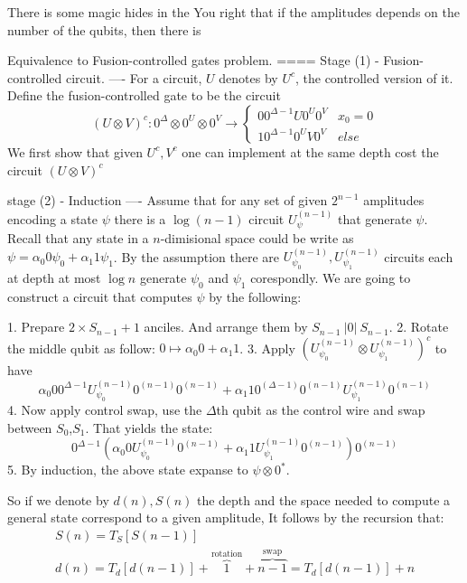 There is some magic hides in the You right that if the amplitudes depends on the number of the qubits, then there is  

Equivalence to Fusion-controlled gates problem.
====
Stage (1) - Fusion-controlled circuit.
----
For a circuit, $U$ denotes by $U^{c}$, the controlled version of it. Define the fusion-controlled gate to be the circuit $$(U\otimes V)^{c} :0^{\Delta}\otimes 0^{U}\otimes 0^{V}   \rightarrow \begin{cases} 0 0^{\Delta -1} U0^{U} 0^{V} & x_{0} = 0\\ 1 0^{\Delta -1} 0^{U} V0^{V} & else \end{cases} $$  We first show that given $U^{c},V^{c}$ one can implement at the same depth cost the circuit $(U\otimes V)^{c}$

stage (2) - Induction 
----
Assume that for any set of given $2^{n-1}$ amplitudes encoding a state $\psi$ there is a $\log(n-1)$ circuit $U_{\psi}^{(n-1)}$ that generate $\psi$. Recall that any state in a $n$-dimisional space could be write as $\psi = \alpha_{0} 0 \psi_{0} + \alpha_{1} 1 \psi_{1} $. By the assumption there are $U_{\psi_{0}}^{(n-1)},U_{\psi_{1}}^{(n-1)}$ circuits each at depth at most $\log n$ generate $\psi_{0}$ and $\psi_{1}$ corespondly. We are going to construct a circuit that computes $\psi$ by the following: 

 1. Prepare $2 \times S_{n-1} + 1$ anciles. And arrange them by $S_{n-1} \ |0| \ S_{n-1}$. 
 2. Rotate the middle qubit as follow: $ 0 \mapsto \alpha_{0} 0 + \alpha_{1} 1 $.   
 3. Apply $\left(U_{\psi_{0}}^{(n-1)} \otimes U_{\psi_{1}}^{(n-1)}\right)^{c} $ to have $$\alpha_{0} 0 0^{\Delta -1} U_{\psi_{0}}^{(n-1)} 0^{(n-1)} 0^{(n-1)} + \alpha_{1} 1 0^{(\Delta - 1)}0^{(n-1)}U_{\psi_{1}}^{(n-1)}0^{(n-1)}$$
4. Now apply control swap, use the $\Delta$th qubit as the control wire and swap between $S_{0}$,$S_{1}$. That yields the state: 
$$ 0^{\Delta -1} \left(\alpha_{0} 0 U_{\psi_{0}}^{(n-1)} 0^{(n-1)} + \alpha_{1} 1 U_{\psi_{1}}^{(n-1)}0^{(n-1)} \right)0^{(n-1)} $$
5. By induction, the above state expanse to $\psi \otimes 0^{*}$.

So if we denote by $d(n), S(n)$ the depth and the space needed to compute a general state correspond to a given amplitude, It follows by the recursion that: 
$$ \begin{split} & S(n) = T_{S}[S(n-1)]  &  \\ & d(n) = T_{d}[d(n-1)] + \overbrace{1}^{ \text{rotation} } + \overbrace{n-1}^{\text{swap}} =  T_{d}[d(n-1)] + n   \end{split} $$     



